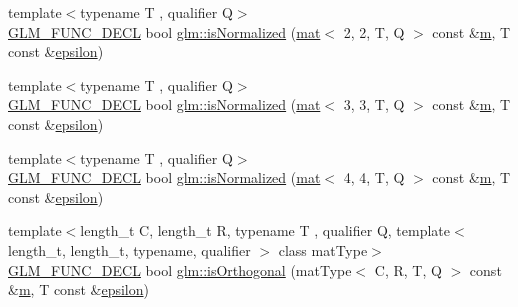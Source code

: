 \begin{DoxyCompactItemize}
\item 
{\footnotesize template$<$typename T , qualifier Q$>$ }\\\mbox{\hyperlink{setup_8hpp_ab2d052de21a70539923e9bcbf6e83a51}{G\+L\+M\+\_\+\+F\+U\+N\+C\+\_\+\+D\+E\+CL}} bool \mbox{\hyperlink{group__gtx__matrix__query_gae785af56f47ce220a1609f7f84aa077a}{glm\+::is\+Normalized}} (\mbox{\hyperlink{structglm_1_1mat}{mat}}$<$ 2, 2, T, Q $>$ const \&\mbox{\hyperlink{_s_d_l__opengl__glext_8h_af593500c283bf1a787a6f947f503a5c2}{m}}, T const \&\mbox{\hyperlink{group__gtc__constants_ga2a1e57fc5592b69cfae84174cbfc9429}{epsilon}})
\item 
{\footnotesize template$<$typename T , qualifier Q$>$ }\\\mbox{\hyperlink{setup_8hpp_ab2d052de21a70539923e9bcbf6e83a51}{G\+L\+M\+\_\+\+F\+U\+N\+C\+\_\+\+D\+E\+CL}} bool \mbox{\hyperlink{group__gtx__matrix__query_gaa068311695f28f5f555f5f746a6a66fb}{glm\+::is\+Normalized}} (\mbox{\hyperlink{structglm_1_1mat}{mat}}$<$ 3, 3, T, Q $>$ const \&\mbox{\hyperlink{_s_d_l__opengl__glext_8h_af593500c283bf1a787a6f947f503a5c2}{m}}, T const \&\mbox{\hyperlink{group__gtc__constants_ga2a1e57fc5592b69cfae84174cbfc9429}{epsilon}})
\item 
{\footnotesize template$<$typename T , qualifier Q$>$ }\\\mbox{\hyperlink{setup_8hpp_ab2d052de21a70539923e9bcbf6e83a51}{G\+L\+M\+\_\+\+F\+U\+N\+C\+\_\+\+D\+E\+CL}} bool \mbox{\hyperlink{group__gtx__matrix__query_ga4d9bb4d0465df49fedfad79adc6ce4ad}{glm\+::is\+Normalized}} (\mbox{\hyperlink{structglm_1_1mat}{mat}}$<$ 4, 4, T, Q $>$ const \&\mbox{\hyperlink{_s_d_l__opengl__glext_8h_af593500c283bf1a787a6f947f503a5c2}{m}}, T const \&\mbox{\hyperlink{group__gtc__constants_ga2a1e57fc5592b69cfae84174cbfc9429}{epsilon}})
\item 
{\footnotesize template$<$length\+\_\+t C, length\+\_\+t R, typename T , qualifier Q, template$<$ length\+\_\+t, length\+\_\+t, typename, qualifier $>$ class mat\+Type$>$ }\\\mbox{\hyperlink{setup_8hpp_ab2d052de21a70539923e9bcbf6e83a51}{G\+L\+M\+\_\+\+F\+U\+N\+C\+\_\+\+D\+E\+CL}} bool \mbox{\hyperlink{group__gtx__matrix__query_ga58f3289f74dcab653387dd78ad93ca40}{glm\+::is\+Orthogonal}} (mat\+Type$<$ C, R, T, Q $>$ const \&\mbox{\hyperlink{_s_d_l__opengl__glext_8h_af593500c283bf1a787a6f947f503a5c2}{m}}, T const \&\mbox{\hyperlink{group__gtc__constants_ga2a1e57fc5592b69cfae84174cbfc9429}{epsilon}})
\end{DoxyCompactItemize}


